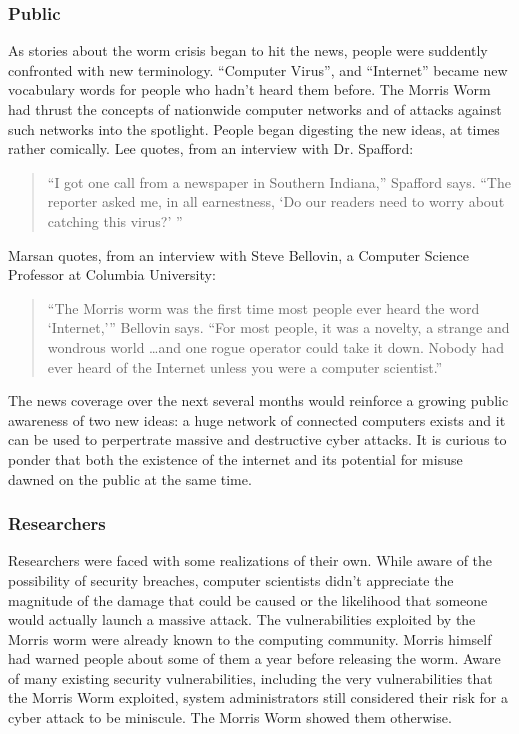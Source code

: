 \subsubsection*{Public}
As stories about the worm crisis began to hit the news, people were suddently
confronted with new terminology. ``Computer Virus'', and ``Internet'' became
new vocabulary words for people who hadn't heard them before. The Morris
Worm had thrust the concepts of nationwide computer networks 
and of attacks against such networks into the spotlight. People began digesting
the new ideas, at times rather comically.
Lee\cite{lee_washpost_2013} quotes, from an
interview with Dr. Spafford:
\begin{quote}
``I got one call from a newspaper in Southern Indiana,'' Spafford says. ``The
reporter asked me, in all earnestness, `Do our readers need to worry about
catching this virus?' ''
\end{quote}
Marsan\cite{marsan_morris_2008} quotes, from an
interview with Steve Bellovin, a Computer Science Professor at Columbia
University:
\begin{quote}
``The Morris worm was the first time most people ever heard the word
`Internet,'{''} Bellovin says. ``For most people, it was a novelty, a strange
and wondrous world \ldots and one rogue operator could take it down. Nobody had
ever heard of the Internet unless you were a computer scientist.''
\end{quote}
The news coverage over the next several months would reinforce a growing public
awareness of two new ideas: a huge network of connected
computers exists and it can be used to perpertrate massive and destructive
cyber attacks.
It is curious to ponder that both the existence of the internet and its
potential for misuse dawned on the public at the same time.
           	
\subsubsection*{Researchers}
Researchers were faced with some realizations of their own. While aware of the
possibility of security breaches, computer scientists didn't appreciate the
magnitude of the damage that could be caused or the likelihood that someone
would actually launch a massive attack. The vulnerabilities exploited by the
Morris worm were already known to the computing community. Morris himself
had warned people about some of them\cite{spafford_internet_1989} a year before
releasing the worm. Aware of many
existing security vulnerabilities, including the very vulnerabilities that
the Morris Worm exploited, system administrators still considered their risk
for a cyber attack to be miniscule. The Morris Worm showed them otherwise. 

